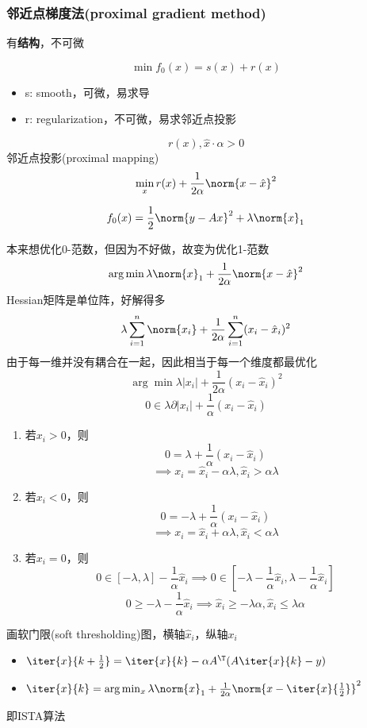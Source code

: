 \subsubsection{邻近点梯度法(proximal gradient method)}
有\textbf{结构}，不可微

\[\min f_0(x)=s(x)+r(x)\]
\begin{itemize}
    \item s: smooth，可微，易求导
    \item r: regularization，不可微，易求邻近点投影
\end{itemize}

\[r(x),\hat{x}\cdot\alpha>0\]
邻近点投影(proximal mapping)
\[\min_x r(x)+\frac{1}{2\alpha}\norm{x-\hat{x}}^2\]
\begin{example}[LASSO]
    \[f_0(x)=\frac{1}{2}\norm{y-Ax}^2+\lambda\norm{x}_1\]
\end{example}
\begin{analysis}
    本来想优化0-范数，但因为不好做，故变为优化1-范数
    \[\arg\min\lambda\norm{x}_1+\frac{1}{2\alpha}\norm{x-\hat{x}}^2\]
    Hessian矩阵是单位阵，好解得多
    \[\lambda\sum_{i=1}^n\norm{x_i}+\frac{1}{2\alpha}\sum_{i=1}^n(x_i-\hat{x}_i)^2\]
    由于每一维并没有耦合在一起，因此相当于每一个维度都最优化
    \[\arg\min\lambda |x_i|+\frac{1}{2\alpha}(x_i-\hat{x}_i)^2\] %
    \[0\in\lambda\partial|x_i|+\frac{1}{\alpha}(x_i-\hat{x}_i)\]
    \begin{enumerate}
        \item 若$x_i>0$，则
        \[0=\lambda+\frac{1}{\alpha}(x_i-\hat{x}_i)\]
        \[\implies x_i=\hat{x}_i-\alpha\lambda,\hat{x}_i>\alpha\lambda\]
        \item 若$x_i<0$，则
        \[0=-\lambda+\frac{1}{\alpha}(x_i-\hat{x}_i)\]
        \[\implies x_i=\hat{x}_i+\alpha\lambda,\hat{x}_i<\alpha\lambda\]
        \item 若$x_i=0$，则
        \[0\in[-\lambda,\lambda]-\frac{1}{\alpha}\hat{x}_i\implies 0\in[-\lambda-\frac{1}{\alpha}\hat{x}_i,\lambda-\frac{1}{\alpha}\hat{x}_i]\]
        \[0\geq -\lambda-\frac{1}{\alpha}\hat{x}_i\implies \hat{x}_i\geq -\lambda\alpha,\hat{x}_i\leq\lambda\alpha\]
    \end{enumerate}
    画软门限(soft thresholding)图，横轴$\hat{x}_i$，纵轴$x_i$
    \begin{itemize}
        \item $\iter{x}{k+\frac{1}{2}}=\iter{x}{k}-\alpha A^\T (A\iter{x}{k}-y)$
        \item $\iter{x}{k}=\arg\min_x\lambda\norm{x}_1+\frac{1}{2\alpha}\norm{x-\iter{x}{\frac{1}{2}}}^2$
    \end{itemize}
    即ISTA算法
\end{analysis}

